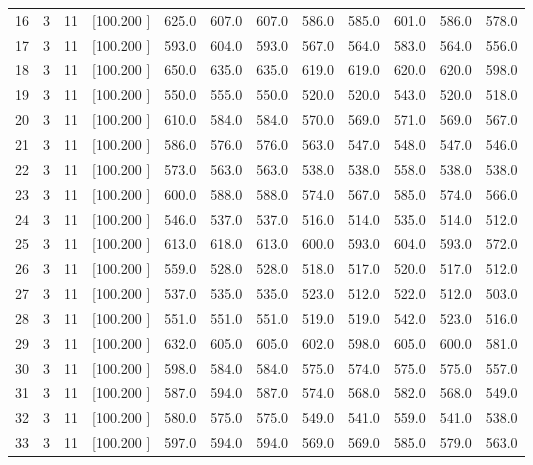 \documentclass[12pt,a4paper]{article}
\begin{document}
\begin{center}
{\begin{tabular}{r r r r r r r r r r r r}
  16&  3& 11&[100.200   ]&   625.0&   607.0&   607.0&   586.0&   585.0&   601.0&   586.0&   578.0\\[-0.02in]
  17&  3& 11&[100.200   ]&   593.0&   604.0&   593.0&   567.0&   564.0&   583.0&   564.0&   556.0\\[-0.02in]
  18&  3& 11&[100.200   ]&   650.0&   635.0&   635.0&   619.0&   619.0&   620.0&   620.0&   598.0\\[-0.02in]
  19&  3& 11&[100.200   ]&   550.0&   555.0&   550.0&   520.0&   520.0&   543.0&   520.0&   518.0\\[-0.02in]
  20&  3& 11&[100.200   ]&   610.0&   584.0&   584.0&   570.0&   569.0&   571.0&   569.0&   567.0\\[-0.02in]
  21&  3& 11&[100.200   ]&   586.0&   576.0&   576.0&   563.0&   547.0&   548.0&   547.0&   546.0\\[-0.02in]
  22&  3& 11&[100.200   ]&   573.0&   563.0&   563.0&   538.0&   538.0&   558.0&   538.0&   538.0\\[-0.02in]
  23&  3& 11&[100.200   ]&   600.0&   588.0&   588.0&   574.0&   567.0&   585.0&   574.0&   566.0\\[-0.02in]
  24&  3& 11&[100.200   ]&   546.0&   537.0&   537.0&   516.0&   514.0&   535.0&   514.0&   512.0\\[-0.02in]
  25&  3& 11&[100.200   ]&   613.0&   618.0&   613.0&   600.0&   593.0&   604.0&   593.0&   572.0\\[-0.02in]
  26&  3& 11&[100.200   ]&   559.0&   528.0&   528.0&   518.0&   517.0&   520.0&   517.0&   512.0\\[-0.02in]
  27&  3& 11&[100.200   ]&   537.0&   535.0&   535.0&   523.0&   512.0&   522.0&   512.0&   503.0\\[-0.02in]
  28&  3& 11&[100.200   ]&   551.0&   551.0&   551.0&   519.0&   519.0&   542.0&   523.0&   516.0\\[-0.02in]
  29&  3& 11&[100.200   ]&   632.0&   605.0&   605.0&   602.0&   598.0&   605.0&   600.0&   581.0\\[-0.02in]
  30&  3& 11&[100.200   ]&   598.0&   584.0&   584.0&   575.0&   574.0&   575.0&   575.0&   557.0\\[-0.02in]
  31&  3& 11&[100.200   ]&   587.0&   594.0&   587.0&   574.0&   568.0&   582.0&   568.0&   549.0\\[-0.02in]
  32&  3& 11&[100.200   ]&   580.0&   575.0&   575.0&   549.0&   541.0&   559.0&   541.0&   538.0\\[-0.02in]
  33&  3& 11&[100.200   ]&   597.0&   594.0&   594.0&   569.0&   569.0&   585.0&   579.0&   563.0\\[-0.02in]

\end{tabular}}
\end{center}
\end{document}
